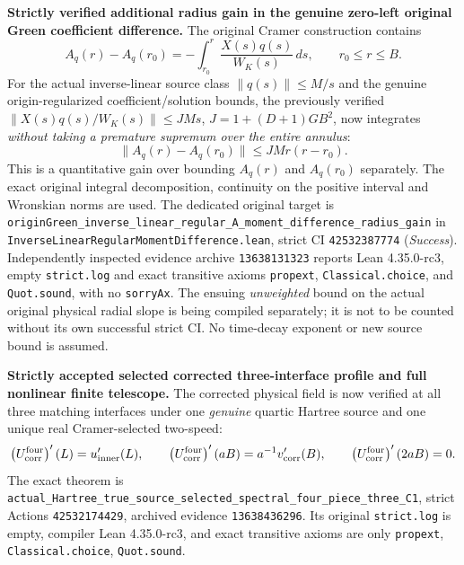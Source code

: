 \documentclass[11pt]{amsart}
\begin{document}
\medskip
\noindent\textbf{Strictly verified additional radius gain in the genuine
zero-left original Green coefficient difference.}
The original Cramer construction contains
\[
 A_q(r)-A_q(r_0)=-\int_{r_0}^{r}
               \frac{X(s)q(s)}{W_K(s)}\,ds,
 \qquad r_0\le r\le B.
\]
For the actual inverse-linear source class
\(\|q(s)\|\le M/s\) and the genuine origin-regularized
coefficient/solution bounds, the previously verified
\(\|X(s)q(s)/W_K(s)\|\le JM s\),
\(J=1+(D+1)GB^2\), now integrates \emph{without taking
a premature supremum over the entire annulus}:
\[
 \boxed{\;
 \|A_q(r)-A_q(r_0)\|
       \le JMr(r-r_0).\;}
\]
This is a quantitative gain over bounding \(A_q(r)\)
and \(A_q(r_0)\) separately. The exact original
integral decomposition, continuity on the positive interval
and Wronskian norms are used.
The dedicated original target is
\texttt{originGreen\_inverse\_linear\_regular\_A\_moment\_difference\_radius\_gain}
in
\texttt{InverseLinearRegularMomentDifference.lean},
strict CI \texttt{42532387774}
(\emph{Success}). Independently inspected evidence archive
\texttt{13638131323} reports Lean 4.35.0-rc3,
empty \texttt{strict.log} and exact transitive axioms
\texttt{propext}, \texttt{Classical.choice}, and
\texttt{Quot.sound}, with no \texttt{sorryAx}.
The ensuing \emph{unweighted} bound on the actual original
physical radial slope is being compiled separately; it is
not to be counted without its own successful strict CI.
No time-decay exponent or new source bound is assumed.


\medskip
\noindent\textbf{Strictly accepted selected corrected three-interface
profile and full nonlinear finite telescope.}
The corrected physical field is now verified at all three matching
interfaces under one \emph{genuine} quartic Hartree source and one
unique real Cramer-selected two-speed:
\[
 \left(U_{\rm corr}^{\rm four}\right)'(L)
       =u_{\rm inner}'(L),\qquad
 \left(U_{\rm corr}^{\rm four}\right)'(aB)
       =a^{-1}v_{\rm corr}'(B),\qquad
 \left(U_{\rm corr}^{\rm four}\right)'(2aB)=0.
\]
The exact theorem is
\texttt{actual_Hartree_true_source_selected_spectral_four_piece_three_C1},
strict Actions \texttt{42532174429}, archived evidence
\texttt{13638436296}. Its original \texttt{strict.log} is
empty, compiler Lean 4.35.0-rc3, and exact transitive axioms
are only
\texttt{propext}, \texttt{Classical.choice},
\texttt{Quot.sound}.
\end{document}
